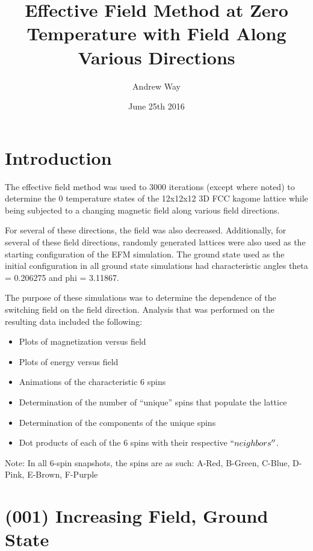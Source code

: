 \documentclass{article}
\title{Effective Field Method at Zero Temperature with Field Along Various Directions}
\author{Andrew Way}
\date{June 25th 2016}
\begin{document}
\maketitle

\tableofcontents

\section{Introduction}
    The effective field method was used to 3000 iterations (except where noted) to determine the 0 temperature states of 
    the 12x12x12 3D FCC kagome lattice while being subjected to a changing magnetic field along various field
    directions. 
    
    For several of these directions, the field was also decreased. Additionally, for several of these
    field directions, randomly generated lattices were also used as the starting configuration of the EFM simulation. The
    ground state used as the initial configuration in all ground state simulations had characteristic angles theta = 0.206275 and phi = 3.11867.
    
    The purpose of these simulations was to determine the dependence of the switching field on the field direction.
    Analysis that was performed on the resulting data included the following:
    \begin{itemize}
     \item Plots of magnetization versus field
     \item Plots of energy versus field
     \item Animations of the characteristic 6 spins 
     \item Determination of the number of ``unique'' spins that populate the lattice
     \item Determination of the components of the unique spins
     \item Dot products of each of the 6 spins with their respective $``neighbors''$.  
    \end{itemize}
    Note: In all 6-spin snapshots, the spins are as such: A-Red, B-Green, C-Blue, D-Pink, E-Brown, F-Purple
\clearpage
\section{(001) Increasing Field, Ground State}
\end{document}
